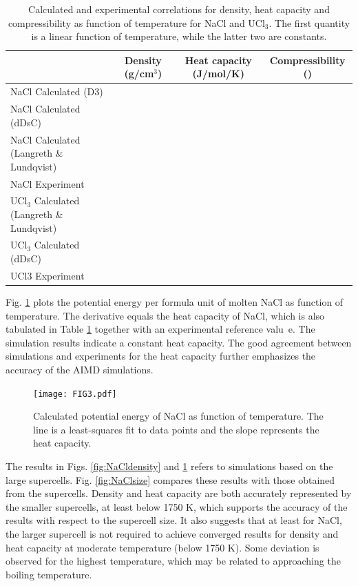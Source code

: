 \documentclass[preprint,3p,10pt,twocolumn,number,sort&compress]{elsarticle}
\begin{document}
\begin{table}[hb!]
\centering
\begin{tabular}{lccc}
\hline
\hline
& Density (g/cm$^3$)	&Heat capacity (J/mol/K) &Compressibility ()\\
\hline
NaCl Calculated (D3)	& & &\\
NaCl Calculated (dDsC)	& & &\\
NaCl Calculated (Langreth \& Lundqvist)	& & &\\
NaCl Experiment	& & &\\
UCl$_3$ Calculated (Langreth \& Lundqvist) & & & \\	
UCl$_3$ Calculated (dDsC) & & & \\	
UCl3 Experiment	& & & \\
\hline
\hline
\end{tabular}
\caption{Calculated and experimental correlations for density, heat capacity and compressibility as function of temperature for NaCl and UCl$_3$. The first quantity is a linear function of temperature, while the latter two are constants.}
\label{table:NaCldensityetc}
\end{table}
 
Fig. \ref{fig:NaClheatc} plots the potential energy per formula unit of molten NaCl as function of temperature. The derivative equals the heat capacity of NaCl, which is also tabulated in Table \ref{table:NaCldensityetc} together with an experimental reference valu~\cite{}e. The simulation results indicate a constant heat capacity. The good agreement between simulations and experiments for the heat capacity further emphasizes the accuracy of the AIMD simulations.  

\begin{figure}[htb]
\centering
\texttt{[image: FIG3.pdf]}
\caption{Calculated potential energy of NaCl as function of temperature. The line is a least-squares fit to data points and the slope represents the heat capacity.} 
\label{fig:NaClheatc}
\end{figure}

The results in Figs. \ref{fig:NaCldensity} and \ref{fig:NaClheatc} refers to simulations based on the large supercells. Fig. \ref{fig:NaClsize} compares these results with those obtained from the supercells. Density and heat capacity are both accurately represented by the smaller supercells, at least below 1750 K, which supports the accuracy of the results with respect to the supercell size. It also suggests that at least for NaCl, the larger supercell is not required to achieve converged results for density and heat capacity at moderate temperature (below 1750 K). Some deviation is observed for the highest temperature, which may be related to approaching the boiling temperature. 
\end{document}
